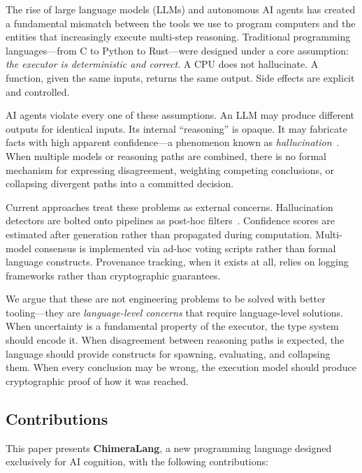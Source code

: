 \documentclass[11pt,a4paper]{article}
\begin{document}
The rise of large language models (LLMs) and autonomous AI agents has created a
fundamental mismatch between the tools we use to program computers and the
entities that increasingly execute multi-step reasoning. Traditional programming
languages---from C to Python to Rust---were designed under a core assumption:
\emph{the executor is deterministic and correct}. A CPU does not hallucinate. A
function, given the same inputs, returns the same output. Side effects are
explicit and controlled.

AI agents violate every one of these assumptions. An LLM may produce different
outputs for identical inputs. Its internal ``reasoning'' is opaque. It may
fabricate facts with high apparent confidence---a phenomenon known as
\emph{hallucination}~\cite{ji2023hallucination}. When multiple models or
reasoning paths are combined, there is no formal mechanism for expressing
disagreement, weighting competing conclusions, or collapsing divergent paths into
a committed decision.

Current approaches treat these problems as external concerns. Hallucination
detectors are bolted onto pipelines as post-hoc filters~\cite{manakul2023selfcheckgpt}.
Confidence scores are estimated after generation rather than propagated during
computation. Multi-model consensus is implemented via ad-hoc voting scripts
rather than formal language constructs. Provenance tracking, when it exists at
all, relies on logging frameworks rather than cryptographic guarantees.

We argue that these are not engineering problems to be solved with better
tooling---they are \emph{language-level concerns} that require language-level
solutions. When uncertainty is a fundamental property of the executor, the type
system should encode it. When disagreement between reasoning paths is expected,
the language should provide constructs for spawning, evaluating, and collapsing
them. When every conclusion may be wrong, the execution model should produce
cryptographic proof of how it was reached.

\subsection{Contributions}
\label{sec:contributions}

This paper presents \textbf{ChimeraLang}, a new programming language designed
exclusively for AI cognition, with the following contributions:
\end{document}
